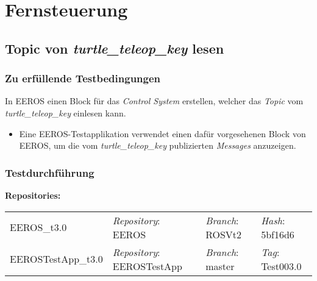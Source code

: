 \section{Fernsteuerung}
\subsection{Topic von \textit{turtle\_teleop\_key} lesen}
\subsubsection{Zu erfüllende Testbedingungen}
In EEROS einen Block für das \textit{Control System} erstellen, welcher das \textit{Topic} vom \textit{turtle\_teleop\_key} einlesen kann.
\begin{itemize}
\item Eine EEROS-Testapplikation verwendet einen dafür vorgesehenen Block von EEROS, um die vom \textit{turtle\_teleop\_key} publizierten \textit{Messages} anzuzeigen.
\end{itemize}

\subsubsection{Testdurchführung}
\textbf{Repositories:} \\
\begin{tabular}
  { l						| l			 							l								 l								}

  EEROS\_t3.0				& \textit{Repository}: EEROS			& \textit{Branch}: ROSVt2		& \textit{Hash}: 5bf16d6		\\
  EEROSTestApp\_t3.0		& \textit{Repository}: EEROSTestApp	& \textit{Branch}: master		& \textit{Tag}: Test003.0		\\
\end{tabular}

